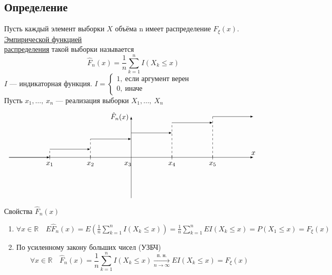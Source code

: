 \documentclass[12pt, a4paper]{article}
\begin{document}
\subsection*{Определение}
Пусть каждый элемент выборки $X$ объёма n имеет распределение $F_{\xi}(x)$. \underline{Эмпирической функцией}\\ \underline{распределения} такой выборки называется
\[\hat{F}_n(x) = \frac{1}{n} \sum_{k = 1}^{n} I(X_k\leq x)\]
$I$ --- индикаторная функция. $I = \begin{cases}
    1,\ \text{если аргумент верен}\\
    0,\ \text{иначе}
\end{cases}$\\
Пусть $x_1,\dots,\ x_n$ --- реализация выборки $X_1,\dots,\ X_n$\\
\[\begin{tikzpicture}[scale=2, >=latex]
    \draw[->, >=latex] (0, -1) -- (0, 1) node(0)[anchor = east]{$\hat{F}_n(x)$};
    \draw (-2, -0.05) node(1)[anchor=north]{$x_1$} -- (-2, 0.05);
    \draw (-1, -0.05) node(2)[anchor=north]{$x_2$}-- (-1, 0.05);
    \draw (0.07, -0.05) node(3)[anchor=north east]{$x_3$}-- (0.07, -0.05);
    \draw (1, -0.05) node(4)[anchor=north]{$x_4$}-- (1, 0.05);
    \draw (2, -0.05) node(5)[anchor=north]{$x_5$}-- (2, 0.05);
    \draw[->] (-3, 0) -- (-2, 0);
    \draw[->] (-2, 0.2) -- (-1, 0.2);
    \draw[dashed] (-2, 0) -- (-2, 0.2);
    \draw[->] (-1, 0.45) -- (0, 0.45);
    \draw[dashed] (-1, 0) -- (-1, 0.45);
    \draw[->] (0, 0.6) -- (1, 0.6);
    \draw[dashed] (1, 0) -- (1, 0.85);
    \draw[->] (1, 0.85) -- (2, 0.85);
    \draw[dashed] (2, 0) -- (2, 1);
    \draw[->] (2, 1) -- (3, 1);
    \draw[->] (-3, 0) -- (3, 0) node(2)[anchor = south]{$x$};
\end{tikzpicture}\]
\begin{center}
    Свойства $\hat{F}_n(x)$
\end{center}
\begin{enumerate}
    \item $\displaystyle\forall x\in\mathbb{R}\quad E\hat{F}_n(x) = E\left(\frac{1}{n} \sum_{k = 1}^{n} I(X_k \leq x)\right) = \frac{1}{n} \sum_{k = 1}^{n} EI(X_k \leq x) = P(X_1 \leq x) = F_{\xi}(x)$
    \item По усиленному закону больших чисел (УЗБЧ)
    \[\forall x\in \mathbb{R}\quad \hat{F}_n(x) = \frac{1}{n} \sum_{k = 1}^{n} I(X_k \leq x) \xrightarrow[n\to\infty]{\text{п. н.}} EI(X_k \leq x) = F_{\xi}(x)\]
\end{enumerate}
\end{document}
